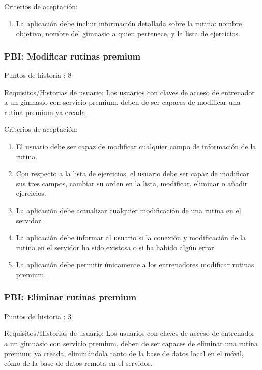 \documentclass[11pt,a4paper]{report}
\begin{document}
Criterios de aceptación:
\begin{enumerate}
	\item La aplicación debe incluir información detallada sobre la rutina: nombre, objetivo, nombre del gimnasio a quien pertenece, y la lista de ejercicios.
	
\end{enumerate}
\subsubsection{PBI: Modificar rutinas premium}

Puntos de historia : 8

Requisitos/Historias de usuario: Los usuarios con claves de acceso de entrenador a un gimnasio con servicio premium, deben de ser capaces de modificar una rutina premium ya creada.

Criterios de aceptación:
\begin{enumerate}
	\item El usuario debe ser capaz de modificar cualquier campo de información de la rutina.
	
	\item Con respecto a la lista de ejercicios, el usuario debe ser capaz de modificar sus tres campos, cambiar su orden en la lista, modificar, eliminar o añadir ejercicios.
	
	\item La aplicación debe actualizar cualquier modificación de una rutina en el servidor.
	
	\item La aplicación debe informar al usuario si la conexión y modificación de la rutina en el servidor ha sido existosa o si ha habido algún error.
	
	\item La aplicación debe permitir únicamente a los entrenadores modificar rutinas premium.
	
\end{enumerate}
\subsubsection{PBI: Eliminar rutinas premium}
Puntos de historia : 3

Requisitos/Historias de usuario: Los usuarios con claves de acceso de entrenador a un gimnasio con servicio premium, deben de ser capaces de eliminar una rutina premium ya creada, eliminándola tanto de la base de datos local en el móvil, cómo de la base de datos remota en el servidor.
\end{document}
